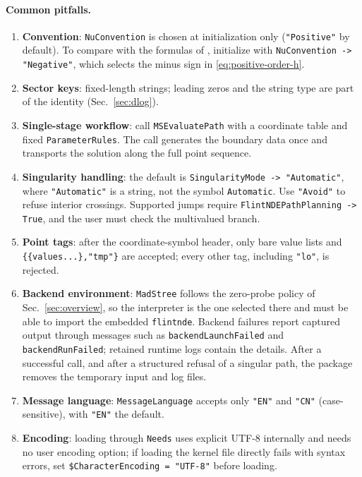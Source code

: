 \documentclass[11pt,a4paper]{article}
\numberwithin{table}{section}
\begin{document}
\paragraph{Common pitfalls.}
\label{sec:pitfalls}

\begin{enumerate}
  \item \textbf{Convention}: \texttt{NuConvention} is chosen at initialization only
        (\texttt{"Positive"} by default). To compare with the formulas of
        \cite{Chen:2024glu}, initialize with \texttt{NuConvention -> "Negative"}, which selects
        the minus sign in \eqref{eq:positive-order-h}.
  \item \textbf{Sector keys}: fixed-length strings; leading zeros and the string type are part of
        the identity (Sec.~\ref{sec:dlog}).
  \item \textbf{Single-stage workflow}: call \texttt{MSEvaluatePath} with a coordinate table
        and fixed \texttt{ParameterRules}. The call generates the boundary data once and
        transports the solution along the full point sequence.
  \item \textbf{Singularity handling}: the default is \texttt{SingularityMode -> "Automatic"},
        where \texttt{"Automatic"} is a string, not the symbol \texttt{Automatic}.
        Use \texttt{"Avoid"} to refuse interior crossings. Supported jumps require
        \texttt{FlintNDEPathPlanning -> True}, and the user must check the multivalued branch.
  \item \textbf{Point tags}: after the coordinate-symbol header, only bare value lists and
        \texttt{\{\{values...\},"tmp"\}} are accepted; every other tag, including
        \texttt{"lo"}, is rejected.
  \item \textbf{Backend environment}: \texttt{MadStree} follows the zero-probe policy of
        Sec.~\ref{sec:overview}, so the interpreter is the one selected there and must be able to
        import the embedded \texttt{flintnde}. Backend failures report captured output through
        messages such as \texttt{backendLaunchFailed} and \texttt{backendRunFailed}; retained runtime
        logs contain the details. After a successful call, and after a structured refusal of a
        singular path, the package removes the temporary input and log files.
  \item \textbf{Message language}: \texttt{MessageLanguage} accepts only \texttt{"EN"} and
        \texttt{"CN"} (case-sensitive), with \texttt{"EN"} the default.
  \item \textbf{Encoding}: loading through \texttt{Needs} uses explicit UTF-8 internally and needs
        no user encoding option; if loading the kernel file directly fails with syntax errors, set
        \texttt{\$CharacterEncoding = "UTF-8"} before loading.
\end{enumerate}
\end{document}
